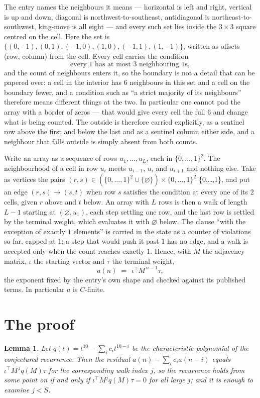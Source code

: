 \documentclass[11pt,a4paper]{article}
\theoremstyle{plain}
\newtheorem{lemma}[theorem]{Lemma}
\theoremstyle{definition}
\begin{document}
The entry names the neighbours it means --- horizontal is left and right, vertical is up and
down, diagonal is northwest-to-southeast, antidiagonal is northeast-to-southwest, king-move is
all eight --- and every such set lies inside the $3\times3$ square centred on the cell. Here
the set is $\{(0,-1), (0,1), (-1,0), (1,0), (-1,1), (1,-1)\}$, written as offsets (row, column) from the cell. Every cell carries
the condition
\[
\text{every 1 has at most 3 neighbouring 1s},
\]
and the count of neighbours enters it, so the boundary is not a detail that can be papered
over: a cell in the interior has $6$ neighbours in this set and a cell on the boundary
fewer, and a condition such as ``a strict majority of its neighbours'' therefore means
different things at the two. In particular one cannot pad the array with a border of zeros ---
that would give every cell the full $6$ and change what is being counted. The outside is
therefore carried
explicitly, as a sentinel row above the first and below the last and as a sentinel column
either side, and a neighbour that falls outside is simply absent from both counts.

Write an array as a sequence of rows $u_1,\dots,u_L$, each in
$\{0,\dots,1\}^{2}$. The neighbourhood of a cell in row $u_i$ meets $u_{i-1}$,
$u_i$ and $u_{i+1}$ and nothing else. Take as vertices the pairs
$(r,s)\in(\{0,\dots,1\}^{2}\cup\{\varnothing\})\times\{0,\dots,1\}^{2}$ \times \{0,\dots,1\},
and put an edge $(r,s)\to(s,t)$ when row $s$ satisfies the condition at every one of its
$2$ cells, given $r$ above and $t$ below. An array with $L$ rows is then a walk of length
$L-1$ starting at $(\varnothing,u_1)$, each step settling one row, and the last row is
settled by the terminal weight, which evaluates it with $\varnothing$ below. The clause ``with the exception of exactly $1$ elements'' is carried in
the state as a counter of violations so far, capped at $1$; a step that would push it past
$1$ has no edge, and a walk is accepted only when the count reaches exactly $1$. Hence,
with $M$ the adjacency matrix, $\iota$ the starting vector and $\tau$ the terminal weight,
\[
a(n)\;=\;\,\iota^{\!\top}M^{\,n-1}\tau ,
\]
the exponent fixed by the entry's own shape and checked against its published terms. In
particular $a$ is $C$-finite.

\section{The proof}

\begin{lemma}\label{lem:crit}
Let $q(t)=t^{10}-\sum_i c_it^{10-i}$ be the characteristic polynomial of the
conjectured recurrence. Then the residual $a(n)-\sum_ic_ia(n-i)$ equals
$\iota^{\!\top}M^{\,j}q(M)\tau$ for the corresponding walk index $j$, so the
recurrence holds from some point on if and only if $\iota^{\!\top}M^{j}q(M)\tau=0$ for all
large $j$; and it is enough to examine $j<S$.
\end{lemma}
\end{document}
